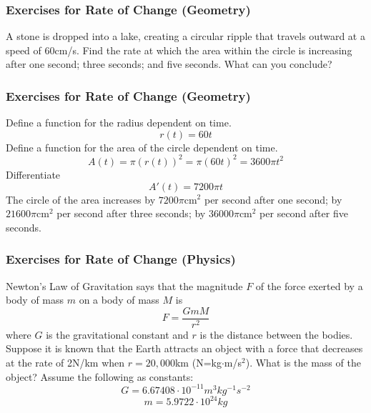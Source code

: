 \documentclass[xcolor=dvipsnames]{beamer}
\begin{document}
\begin{frame}
  \frametitle{Exercises for Rate of Change (Geometry)}
A stone is dropped into a lake, creating a circular ripple that
travels outward at a speed of 60cm/s. Find the rate at which the area
within the circle is increasing after one second; three seconds; and
five seconds. What can you conclude?
\end{frame}

\begin{frame}
  \frametitle{Exercises for Rate of Change (Geometry)}
  Define a function for the radius dependent on time.
  \begin{equation}
    \label{eq:zoozohte}
    r(t)=60t
  \end{equation}
  Define a function for the area of the circle dependent on time.
  \begin{equation}
    \label{eq:maeneong}
    A(t)=\pi(r(t))^{2}=\pi(60t)^{2}=3600\pi{}t^{2}
  \end{equation}
  Differentiate
  \begin{equation}
    \label{eq:cheemahv}
    A'(t)=7200\pi{}t
  \end{equation}
  The circle of the area increases by $7200\pi$cm$^{2}$ per second
  after one second; by $21600\pi$cm$^{2}$ per second after three
  seconds; by $36000\pi$cm$^{2}$ per second after five seconds.
\end{frame}

\begin{frame}
  \frametitle{Exercises for Rate of Change (Physics)}
Newton's Law of Gravitation says that the magnitude $F$ of the force
exerted by a body of mass $m$ on a body of mass $M$ is 
\begin{equation}
  \label{eq:zeipouqu}
  F=\frac{GmM}{r^{2}}
\end{equation}
where $G$ is the gravitational constant and $r$ is the distance
between the bodies. Suppose it is known that the Earth attracts an
object with a force that decreases at the rate of 2N/km when
$r=20,000$km (N=kg$\cdot$m/s$^{2}$). What is the mass of the object?
Assume the following as constants:
\begin{equation}
  \label{eq:phosulee}
  G=6.67408\cdot{}10^{-11}m^{3}kg^{-1}s^{-2}
\end{equation}
\begin{equation}
  \label{eq:otienaix}
  m=5.9722\cdot{}10^{24}kg
\end{equation}
\end{frame}
\end{document}
